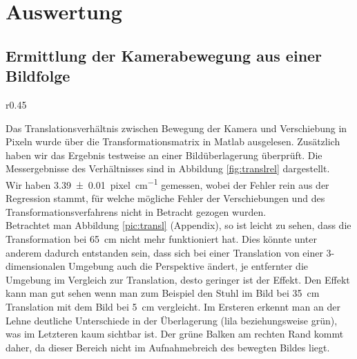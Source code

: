 \section{Auswertung}
\subsection{Ermittlung der Kamerabewegung aus einer Bildfolge}
\begin{wrapfigure}{r}{0.45\textwidth}
  \vspace{-6pt}
  \vspace{-10pt}
  \caption{Die Translation in Pixeln eines entfernten Objektes im Bild ist linear zur parallelen Verschiebung einer Kamera}
  \label{fig:translrel}
  \vspace{-10pt}
  \resizebox{\linewidth}{!}{}
  \vspace{-30pt}
\end{wrapfigure}
Das Translationsverhältnis zwischen Bewegung der Kamera und Verschiebung in
Pixeln wurde über die Transformationsmatrix in Matlab ausgelesen. Zusätzlich
haben wir das Ergebnis testweise an einer Bildüberlagerung überprüft. Die
Messergebnisse des Verhältnisses sind in Abbildung \ref{fig:translrel}
dargestellt.\\
Wir haben \SI{3.39(1)}{pixel\per\centi\meter} gemessen, wobei der Fehler rein
aus der Regression stammt, für welche mögliche Fehler der Verschiebungen und
des Transformationsverfahrens nicht in Betracht gezogen wurden.\\
Betrachtet man Abbildung \ref{pic:transl} (Appendix), so ist leicht zu sehen,
dass die Transformation bei \SI{65}{\centi\meter} nicht mehr funktioniert hat.
Dies könnte unter anderem dadurch entstanden sein, dass sich bei einer
Translation von einer 3-dimensionalen Umgebung auch die Perspektive ändert, je
entfernter die Umgebung im Vergleich zur Translation, desto geringer ist der
Effekt. Den Effekt kann man gut sehen wenn man zum Beispiel den Stuhl im Bild
bei \SI{35}{\centi\meter} Translation mit dem Bild bei \SI{5}{\centi\meter}
vergleicht. Im Ersteren erkennt man an der Lehne deutliche Unterschiede in der
Überlagerung (lila beziehungsweise grün), was im Letzteren kaum sichtbar ist.
Der grüne Balken am rechten Rand kommt daher, da dieser Bereich nicht im
Aufnahmebreich des bewegten Bildes liegt.

